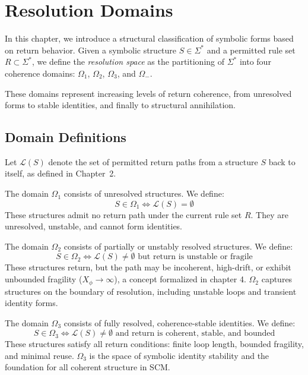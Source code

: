 \chapter{Resolution Domains}

In this chapter, we introduce a structural classification of symbolic forms based on return behavior.  
Given a symbolic structure $S \in \Sigma^*$ and a permitted rule set $R \subset \Sigma^*$,  
we define the \textit{resolution space} as the partitioning of $\Sigma^*$ into four coherence domains:  
$\Omega_1$, $\Omega_2$, $\Omega_3$, and $\Omega_-$.

These domains represent increasing levels of return coherence, from unresolved forms to stable identities, and finally to structural annihilation.

\section{Domain Definitions}

Let $\mathcal{L}(S)$ denote the set of permitted return paths from a structure $S$ back to itself, as defined in Chapter~2.

\begin{definition} \label{def:omega1}
The domain $\Omega_1$ consists of unresolved structures. We define:
\begin{equation} \label{eq:omega1}
S \in \Omega_1 \iff \mathcal{L}(S) = \emptyset
\end{equation}
These structures admit no return path under the current rule set $R$.  
They are unresolved, unstable, and cannot form identities.
\end{definition}

\begin{definition} \label{def:omega2}
The domain $\Omega_2$ consists of partially or unstably resolved structures. We define:
\begin{equation} \label{eq:omega2}
S \in \Omega_2 \iff \mathcal{L}(S) \neq \emptyset \text{ but return is unstable or fragile}
\end{equation}
These structures return, but the path may be incoherent, high-drift, or exhibit unbounded fragility ($X_\phi \rightarrow \infty$), a concept formalized in chapter 4.  
$\Omega_2$ captures structures on the boundary of resolution, including unstable loops and transient identity forms.
\end{definition}

\begin{definition} \label{def:omega3}
The domain $\Omega_3$ consists of fully resolved, coherence-stable identities. We define:
\begin{equation} \label{eq:omega3}
S \in \Omega_3 \iff \mathcal{L}(S) \neq \emptyset \text{ and return is coherent, stable, and bounded}
\end{equation}
These structures satisfy all return conditions: finite loop length, bounded fragility, and minimal reuse.  
$\Omega_3$ is the space of symbolic identity stability and the foundation for all coherent structure in SCM.
\end{definition}

